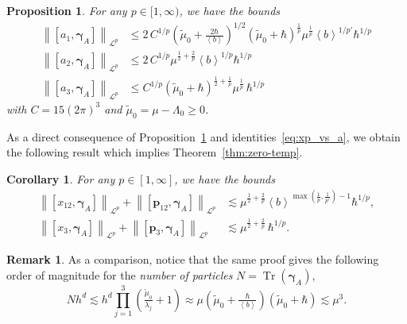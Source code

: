 \documentclass[11pt]{amsart}
\theoremstyle{plain}
\newtheorem{cor}[theorem]{Corollary}
\newtheorem{prop}[theorem]{Proposition}
\theoremstyle{definition}
\newtheorem{remark}[theorem]{Remark}
\renewcommand	{\L}		{\mathcal L}		%
\newcommand		{\lt}			{\left}				%
\newcommand		{\rt}			{\right}			%
\renewcommand	{\(}			{\lt(}
\renewcommand	{\)}			{\rt)}
\newcommand		{\bangle}[1]	{\lt\langle #1\rt\rangle}
\newcommand		{\weight}[1]	{\bangle{#1}}	%
\newcommand		{\com}[1]		{\lt[{#1}\rt]}		%
\newcommand		{\nrm}[1]		{\lt\lVert #1\rt\rVert}
\newcommand		{\Nrm}[2]		{\nrm{#1}_{#2}}
\DeclareMathOperator{\tr}		{Tr}				%
\newcommand		{\Tr}[1]		{\tr\!\( #1 \)}		%
\newcommand		{\hd}		{h^d}
\newcommand		{\opgam}	{{\boldsymbol{\gamma}}}	%
\newcommand		{\opp}		{\boldsymbol{p}}
\begin{document}
	\begin{prop}\label{prop:com_indic}
		For any $p\in [1,\infty)$, we have the bounds
		\begin{align}\label{eq:com_a1_indic}
			\Nrm{\com{a_1,\opgam_A}}{\L^p} &\leq 2 \,C^{1/p} \lt(\tilde{\mu}_0 + \tfrac{2\hbar}{\weight{b}}\rt)^{1/2} \lt(\tilde{\mu}_0 + \hbar\rt)^\frac{1}{p} \mu^\frac{1}{p} \weight{b}^{1/p'}\hbar^{1/p}
			\\\label{eq:com_a2_indic}
			\Nrm{\com{a_2,\opgam_{A}}}{\L^p} &\leq 2 \,C^{1/p} \mu^{\frac{1}{2}+\frac{2}{p}} \weight{b}^{1/p} \hbar^{1/p}
			\\\label{eq:com_a3_indic}
			\Nrm{\com{a_3,\opgam_{A}}}{\L^p} &\leq C^{1/p} \lt(\tilde{\mu}_0 + \hbar\rt)^{\frac{1}{2}+\frac{1}{p}} \mu^\frac{1}{p}\, \hbar^{1/p}
		\end{align}
		with $C = 15\lt(2\pi\rt)^3$ and $\tilde{\mu}_0 = \mu - \Lambda_0 \geq 0$.
	\end{prop}

    As a direct consequence of Proposition~\ref{prop:com_indic} and identities~\eqref{eq:xp_vs_a}, we obtain the following result which implies Theorem~\ref{thm:zero-temp}.
	\begin{cor}\label{cor:zero-temp_magn_comm}
		For any $p\in [1,\infty]$, we have the bounds
		\begin{align*} %
			\Nrm{\com{x_{12},\opgam_{A}}}{\L^p}+\Nrm{\com{\opp_{12},\opgam_{A}}}{\L^p} &\lesssim \mu^{\frac{1}{2}+\frac{2}{p}}  \weight{b}^{\max(\frac{1}{p},\frac{1}{p'})-1} \hbar^{1/p},
            \\
			\Nrm{\com{x_3,\opgam_{A}}}{\L^p}+\Nrm{\com{\opp_3,\opgam_{A}}}{\L^p}  &\lesssim \mu^{\frac{1}{2}+\frac{2}{p}} \,\hbar^{1/p}.
		\end{align*}
	\end{cor}

    \begin{remark}\label{rmk:zero-temp_magn_mass}
        As a comparison, notice that the same proof gives the following order of magnitude for the \textit{number of particles} $N = \Tr{\opgam_A}$,
        \begin{equation*}
            N\hd \lesssim \hd\prod_{j=1}^3 \lt(\tfrac{\tilde{\mu}_0}{\lambda_j} + 1\rt) \approx \mu  \lt(\tilde{\mu}_0 + \tfrac{\hbar}{\weight{b}}\rt) \lt(\tilde{\mu}_0 + \hbar\rt) \lesssim \mu^3 .
        \end{equation*}
    \end{remark}
\end{document}
